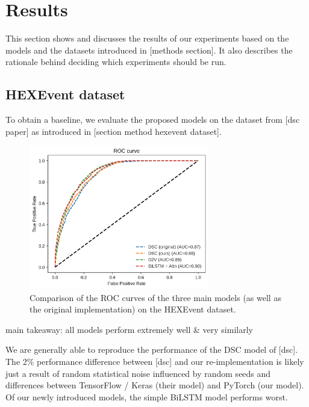 \chapter{\label{ch:5-results}Results}


This section shows and discusses the results of our experiments based on the models and the datasets introduced in [methods section]. It also describes the rationale behind deciding which experiments should be run.

\section{HEXEvent dataset} \label{sec:hexevent}
To obtain a baseline, we evaluate the proposed models on the dataset from [dsc paper] as introduced in [section method hexevent dataset].




\begin{figure}
	\centering\includegraphics[width=0.7\textwidth]{../visualizations/hexevent_cross_model_roc_auc_comparison.png} 
	\caption[bla.]{Comparison of the ROC curves of the three main models (as well as the original implementation) on the HEXEvent dataset. }
	\label{fig:hexevent_auc}
\end{figure}

main takeaway: all models perform extremely well \& very similarly

We are generally able to reproduce the performance of the DSC model of [dsc]. The 2\% performance difference between [dsc] and our re-implementation is likely just a result of random statistical noise influenced by random seeds and differences between TensorFlow / Keras (their model) and PyTorch (our model). Of our newly introduced models, the simple BiLSTM model performs worst.



